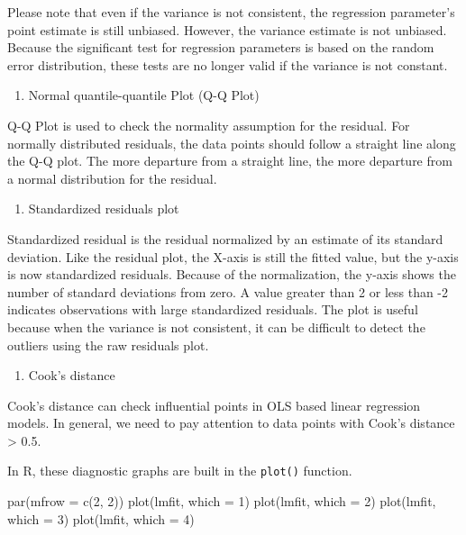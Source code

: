 \documentclass[
  12pt,
]{krantz}
\makeatletter
\newenvironment{Shaded}{\begin{snugshade}}{\end{snugshade}}
\newcommand{\AttributeTok}[1]{\textcolor[rgb]{0.61,0.61,0.61}{#1}}
\newcommand{\DecValTok}[1]{\textcolor[rgb]{0.06,0.06,0.06}{#1}}
\newcommand{\FunctionTok}[1]{\textcolor[rgb]{0,0,0}{#1}}
\newcommand{\NormalTok}[1]{#1}
\providecommand{\tightlist}{%
  \setlength{\itemsep}{0pt}\setlength{\parskip}{0pt}}
\newenvironment{kframe}{%
\medskip{}
\setlength{\fboxsep}{.8em}
 \def\at@end@of@kframe{}%
 \ifinner\ifhmode%
  \def\at@end@of@kframe{\end{minipage}}%
  \begin{minipage}{\columnwidth}%
 \fi\fi%
 \def\FrameCommand##1{\hskip\@totalleftmargin \hskip-\fboxsep
 \colorbox{shadecolor}{##1}\hskip-\fboxsep
     \hskip-\linewidth \hskip-\@totalleftmargin \hskip\columnwidth}%
 \MakeFramed {\advance\hsize-\width
   \@totalleftmargin\z@ \linewidth\hsize
   \@setminipage}}%
 {\par\unskip\endMakeFramed%
 \at@end@of@kframe}
\renewenvironment{Shaded}{\begin{kframe}}{\end{kframe}}
\makeatother
\begin{document}
Please note that even if the variance is not consistent, the regression parameter's point estimate is still unbiased. However, the variance estimate is not unbiased. Because the significant test for regression parameters is based on the random error distribution, these tests are no longer valid if the variance is not constant.

\begin{enumerate}
\def\labelenumi{(\arabic{enumi})}
\setcounter{enumi}{1}
\tightlist
\item
  Normal quantile-quantile Plot (Q-Q Plot) 
\end{enumerate}

Q-Q Plot is used to check the normality assumption for the residual. For normally distributed residuals, the data points should follow a straight line along the Q-Q plot. The more departure from a straight line, the more departure from a normal distribution for the residual.

\begin{enumerate}
\def\labelenumi{(\arabic{enumi})}
\setcounter{enumi}{2}
\tightlist
\item
  Standardized residuals plot 
\end{enumerate}

Standardized residual is the residual normalized by an estimate of its standard deviation. Like the residual plot, the X-axis is still the fitted value, but the y-axis is now standardized residuals. Because of the normalization, the y-axis shows the number of standard deviations from zero. A value greater than 2 or less than -2 indicates observations with large standardized residuals. The plot is useful because when the variance is not consistent, it can be difficult to detect the outliers using the raw residuals plot.

\begin{enumerate}
\def\labelenumi{(\arabic{enumi})}
\setcounter{enumi}{3}
\tightlist
\item
  Cook's distance 
\end{enumerate}

Cook's distance can check influential points in OLS based linear regression models. In general, we need to pay attention to data points with Cook's distance \textgreater{} 0.5.

In R, these diagnostic graphs are built in the \texttt{plot()} function.

\begin{Shaded}
\begin{Highlighting}[]
\FunctionTok{par}\NormalTok{(}\AttributeTok{mfrow =} \FunctionTok{c}\NormalTok{(}\DecValTok{2}\NormalTok{, }\DecValTok{2}\NormalTok{))}
\FunctionTok{plot}\NormalTok{(lmfit, }\AttributeTok{which =} \DecValTok{1}\NormalTok{)}
\FunctionTok{plot}\NormalTok{(lmfit, }\AttributeTok{which =} \DecValTok{2}\NormalTok{)}
\FunctionTok{plot}\NormalTok{(lmfit, }\AttributeTok{which =} \DecValTok{3}\NormalTok{)}
\FunctionTok{plot}\NormalTok{(lmfit, }\AttributeTok{which =} \DecValTok{4}\NormalTok{)}
\end{Highlighting}
\end{Shaded}
\end{document}
